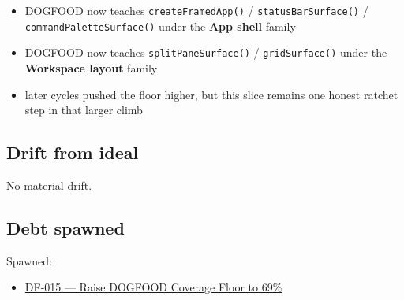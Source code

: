 \begin{itemize}
\tightlist
\item
  DOGFOOD now teaches \texttt{c\allowbreak{}r\allowbreak{}e\allowbreak{}a\allowbreak{}t\allowbreak{}e\allowbreak{}F\allowbreak{}r\allowbreak{}a\allowbreak{}m\allowbreak{}e\allowbreak{}d\allowbreak{}A\allowbreak{}p\allowbreak{}p\allowbreak{}(\allowbreak{})} / \texttt{s\allowbreak{}t\allowbreak{}a\allowbreak{}t\allowbreak{}u\allowbreak{}s\allowbreak{}B\allowbreak{}a\allowbreak{}r\allowbreak{}S\allowbreak{}u\allowbreak{}r\allowbreak{}f\allowbreak{}a\allowbreak{}c\allowbreak{}e\allowbreak{}(\allowbreak{})} / \texttt{c\allowbreak{}o\allowbreak{}m\allowbreak{}m\allowbreak{}a\allowbreak{}n\allowbreak{}d\allowbreak{}P\allowbreak{}a\allowbreak{}l\allowbreak{}e\allowbreak{}t\allowbreak{}t\allowbreak{}e\allowbreak{}S\allowbreak{}u\allowbreak{}r\allowbreak{}f\allowbreak{}a\allowbreak{}c\allowbreak{}e\allowbreak{}(\allowbreak{})} under the \textbf{App shell} family
\item
  DOGFOOD now teaches \texttt{s\allowbreak{}p\allowbreak{}l\allowbreak{}i\allowbreak{}t\allowbreak{}P\allowbreak{}a\allowbreak{}n\allowbreak{}e\allowbreak{}S\allowbreak{}u\allowbreak{}r\allowbreak{}f\allowbreak{}a\allowbreak{}c\allowbreak{}e\allowbreak{}(\allowbreak{})} / \texttt{g\allowbreak{}r\allowbreak{}i\allowbreak{}d\allowbreak{}S\allowbreak{}u\allowbreak{}r\allowbreak{}f\allowbreak{}a\allowbreak{}c\allowbreak{}e\allowbreak{}(\allowbreak{})} under the \textbf{Workspace layout} family
\item
  later cycles pushed the floor higher, but this slice remains one honest ratchet step in that larger climb
\end{itemize}

\subsection{Drift from ideal}\label{record-076-drift-from-ideal}

No material drift.

\subsection{Debt spawned}\label{record-076-debt-spawned}

Spawned:

\begin{itemize}
\tightlist
\item
  \href{https://github.com/flyingrobots/bijou/blob/cbd70612140e7a450d764b3c7be1c6af878b99bc/docs/design/DF-015-raise-dogfood-coverage-floor-to-69-percent.md}{DF-015 --- Raise DOGFOOD Coverage Floor to 69\%}
\end{itemize}


